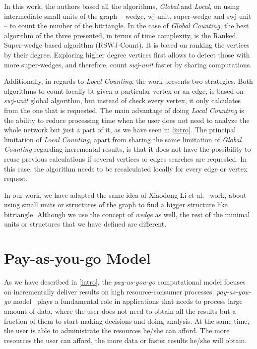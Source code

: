 In this work, the authors based all the algorithms, \emph{Global} and \emph{Local}, on using intermediate small units of the graph -- wedge, wj-unit, super-wedge and swj-unit -- to count the number of the bitriangle.
In the case of \emph{Global Counting}, the best algorithm of the three presented, in terms of time complexity, is the Ranked Super-wedge based algorithm (RSWJ-Count). 
It is based on ranking the vertices by their degree. Exploring higher degree vertices first allows to detect those with more super-wedges, and therefore, count \emph{swj-unit} faster by sharing computations. 

Additionally, in regards to \emph{Local Counting}, the work presents two strategies. 
Both algorithms to count locally \acrshort{bt} given a particular vertex or an edge, is based on \emph{swj-unit} global algorithm, but instead of check every vertex, it only calculates from the one that is requested. 
The main advantage of doing \emph{Local Counting} is the ability to reduce processing time when the user does not need to analyze the whole network but just a part of it, as we have seen in \autoref{intro}.
The principal limitation of \emph{Local Counting}, apart from sharing the same limitation of \emph{Global Counting} regarding incremental results, is that it does not have the possibility to reuse previous calculations if several vertices or edges searches are requested. 
In this case, the algorithm needs to be recalculated locally for every edge or vertex request.

In our work, we have adapted the same idea of Xiaodong Li et al.~\cite{Li2019MotifPA} work, about using small units or structures of the graph to find a bigger structure like bitriangle.
Although we use the concept of \emph{wedge} as well, the rest of the minimal units or structures that we have defined are different.


\section{Pay-as-you-go Model}
As we have described in \autoref{intro}, the \emph{pay-as-you-go} computational model focuses on incrementally deliver results on high resource-consumer processes.
\emph{pay-as-you-go} model~\cite{factcatch} plays a fundamental role in applications that needs to process large amount of data, where the user does not need to obtain all the results but a fraction of them to start making decisions and doing analysis.
At the same time, the user is able to administrate the resources he/she can afford. The more resources the user can afford, the more data or faster results he/she will obtain.


